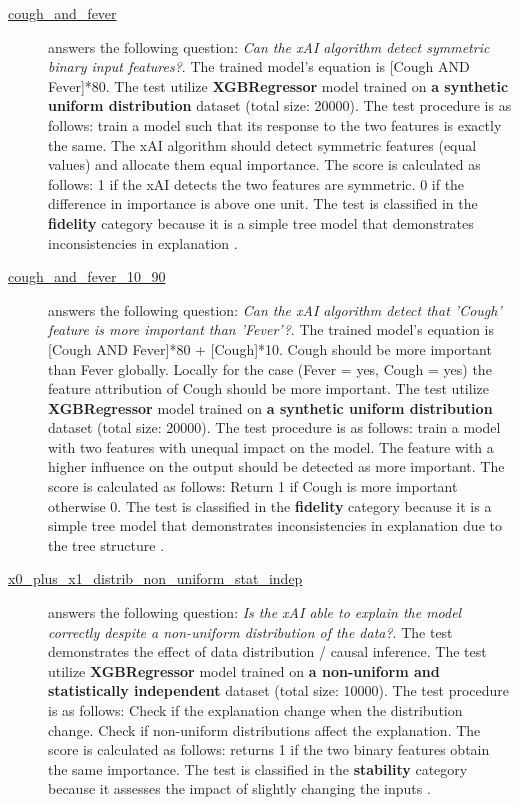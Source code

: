 \begin{description}



\item[\href{Compare-xAI/tree/main/tests/cough_and_fever.py}{cough\_and\_fever}] answers the following question: \emph{Can the xAI algorithm detect symmetric binary input features?}.
The trained model's equation is [Cough AND Fever]*80.
 The test utilize \textbf{XGBRegressor} model trained on \textbf{a synthetic uniform distribution} dataset (total size: 20000).
 The test procedure is as follows: train a model such that its response to the two features is exactly the same. The xAI algorithm should detect symmetric features (equal values) and allocate them equal importance.
 The score is calculated as follows: 1 if the xAI detects the two features are symmetric. 0 if the difference in importance is above one unit.
 The test is classified in the \textbf{fidelity} category because it is a simple tree model that demonstrates inconsistencies in explanation \citep{lundberg2018consistent}.


\item[\href{Compare-xAI/tree/main/tests/cough_and_fever_10_90.py}{cough\_and\_fever\_10\_90}] answers the following question: \emph{Can the xAI algorithm detect that 'Cough' feature is more important than 'Fever'?}.
The trained model's equation is [Cough AND Fever]*80 + [Cough]*10. Cough should be more important than Fever globally. Locally for the case (Fever = yes, Cough = yes) the feature attribution of Cough should be more important.
 The test utilize \textbf{XGBRegressor} model trained on \textbf{a synthetic uniform distribution} dataset (total size: 20000).
 The test procedure is as follows: train a model with two features with unequal impact on the model. The feature with a higher influence on the output should be detected as more important.
 The score is calculated as follows: Return 1 if Cough is more important otherwise 0.
 The test is classified in the \textbf{fidelity} category because it is a simple tree model that demonstrates inconsistencies in explanation due to the tree structure \citep{lundberg2018consistent}.


\item[\href{Compare-xAI/tree/main/tests/x0_plus_x1.py}{x0\_plus\_x1\_distrib\_non\_uniform\_stat\_indep}] answers the following question: \emph{Is the xAI able to explain the model correctly despite a non-uniform distribution of the data?}.
The test demonstrates the effect of data distribution / causal inference.
 The test utilize \textbf{XGBRegressor} model trained on \textbf{a non-uniform and statistically independent} dataset (total size: 10000).
 The test procedure is as follows: Check if the explanation change when the distribution change. Check if non-uniform distributions affect the explanation.
 The score is calculated as follows: returns 1 if the two binary features obtain the same importance.
 The test is classified in the \textbf{stability} category because it assesses the impact of slightly changing the inputs \citep{janzing2020feature}.



\end{description}
